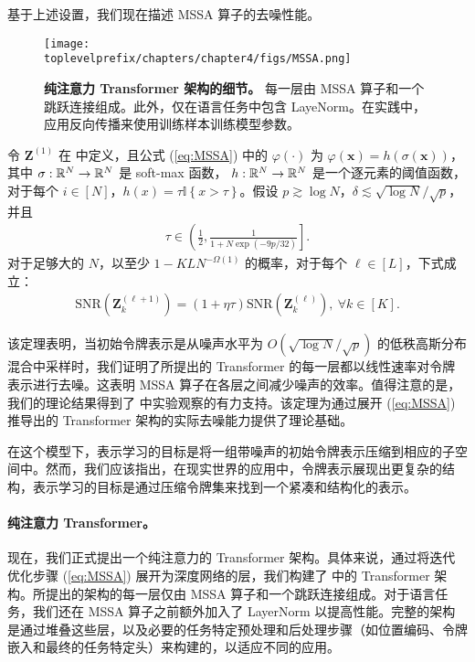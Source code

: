 \documentclass[../../book-main.tex]{subfiles}
\begin{document}
基于上述设置，我们现在描述 MSSA 算子的去噪性能。

\begin{figure*}[t]
\begin{center}
        \texttt{[image: \\toplevelprefix/chapters/chapter4/figs/MSSA.png]}
    \caption{\textbf{纯注意力 Transformer 架构的细节。} 每一层由 MSSA 算子和一个跳跃连接组成。此外，仅在语言任务中包含 LayeNorm。在实践中，应用反向传播来使用训练样本训练模型参数。 %
    }\label{fig:transformer}
\end{center}
\end{figure*}

\begin{theorem}\label{thm:1}
令 $\bm Z^{(1)}$ 在  中定义，且公式 (\ref{eq:MSSA}) 中的 $\varphi(\cdot)$ 为
$\varphi(\bm x) = h\left(\sigma(\bm x)\right)$，
其中 $\sigma:\mathbb{R}^N \to \mathbb{R}^N$ 是 soft-max 函数， $h:\mathbb{R}^N \to \mathbb{R}^N$ 是一个逐元素的阈值函数，对于每个 $i \in [N]$，$h(x) = \tau \mathbb{I}\left\{x > \tau\right\}$。假设 $p \gtrsim \log N$，$\delta \lesssim \sqrt{\log N}/\sqrt{p}$，并且
\begin{align*}
\tau \in \left( \frac{1}{2},  \frac{1}{1+N\exp(-9p/32)} \right].
\end{align*}
对于足够大的 $N$，以至少 $1-KLN^{-\Omega(1)}$ 的概率，对于每个 $\ell \in [L]$，下式成立：
    \begin{align}\label{eq:SNR}
        \mathrm{SNR}(\bm Z_k^{(\ell+1)}) = (1+\eta\tau) \mathrm{SNR}(\bm Z_k^{(\ell)}),\ \forall k \in [K].
    \end{align}
\end{theorem}
该定理表明，当初始令牌表示是从噪声水平为 $O(\sqrt{\log N}/\sqrt{p})$ 的低秩高斯分布混合中采样时，我们证明了所提出的 Transformer 的每一层都以线性速率对令牌表示进行去噪。这表明 MSSA 算子在各层之间减少噪声的效率。值得注意的是，我们的理论结果得到了  中实验观察的有力支持。该定理为通过展开 (\ref{eq:MSSA}) 推导出的 Transformer 架构的实际去噪能力提供了理论基础。

\begin{remark}
    在这个模型下，表示学习的目标是将一组带噪声的初始令牌表示压缩到相应的子空间中。然而，我们应该指出，在现实世界的应用中，令牌表示展现出更复杂的结构，表示学习的目标是通过压缩令牌集来找到一个紧凑和结构化的表示。
\end{remark}


\paragraph{纯注意力 Transformer。} 现在，我们正式提出一个纯注意力的 Transformer 架构。具体来说，通过将迭代优化步骤 (\ref{eq:MSSA}) 展开为深度网络的层，我们构建了  中的 Transformer 架构。所提出的架构的每一层仅由 MSSA 算子和一个跳跃连接组成。对于语言任务，我们还在 MSSA 算子之前额外加入了 LayerNorm 以提高性能。完整的架构是通过堆叠这些层，以及必要的任务特定预处理和后处理步骤（如位置编码、令牌嵌入和最终的任务特定头）来构建的，以适应不同的应用。
\end{document}
